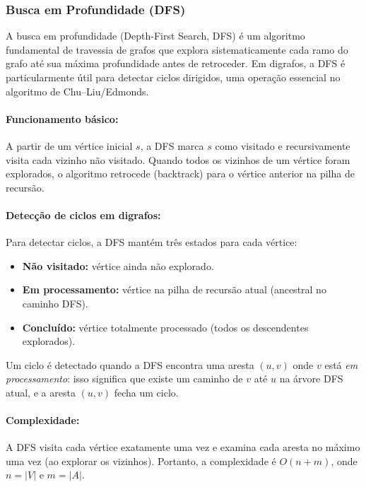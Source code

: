 \subsubsection{Busca em Profundidade (DFS)}
\label{sec:dfs}

A busca em profundidade (Depth-First Search, DFS) é um algoritmo fundamental de travessia de grafos que explora sistematicamente cada ramo do grafo até sua máxima profundidade antes de retroceder. Em digrafos, a DFS é particularmente útil para detectar ciclos dirigidos, uma operação essencial no algoritmo de Chu--Liu/Edmonds.

\paragraph{Funcionamento básico:} A partir de um vértice inicial \(s\), a DFS marca \(s\) como visitado e recursivamente visita cada vizinho não visitado. Quando todos os vizinhos de um vértice foram explorados, o algoritmo retrocede (backtrack) para o vértice anterior na pilha de recursão.

\paragraph{Detecção de ciclos em digrafos:} Para detectar ciclos, a DFS mantém três estados para cada vértice:
\begin{itemize}\setlength{\itemsep}{2pt}
    \item \textbf{Não visitado:} vértice ainda não explorado.
    \item \textbf{Em processamento:} vértice na pilha de recursão atual (ancestral no caminho DFS).
    \item \textbf{Concluído:} vértice totalmente processado (todos os descendentes explorados).
\end{itemize}

Um ciclo é detectado quando a DFS encontra uma aresta \((u,v)\) onde \(v\) está \emph{em processamento}: isso significa que existe um caminho de \(v\) até \(u\) na árvore DFS atual, e a aresta \((u,v)\) fecha um ciclo.

\paragraph{Complexidade:} A DFS visita cada vértice exatamente uma vez e examina cada aresta no máximo uma vez (ao explorar os vizinhos). Portanto, a complexidade é \(O(n+m)\), onde \(n=|V|\) e \(m=|A|\).

